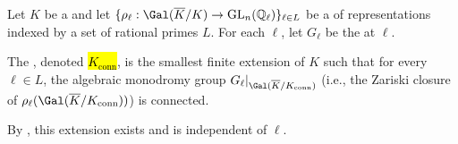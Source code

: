 \begin{definition} \label{definition:connectedness_extension_for_a_compatible_system_of_representations}
    Let $K$ be a  and let $\{ \rho_\ell : \Gal(\overline{K}/K) \to \mathrm{GL}_n(\mathbb{Q}_\ell) \}_{\ell \in L}$ be a  of representations indexed by a set of rational primes $L$. For each $\ell$, let $G_\ell$ be the  at $\ell$.

    The , denoted \hl{$K_{\mathrm{conn}}$}, is the smallest finite extension of $K$ such that for every $\ell \in L$, the algebraic monodromy group $G_\ell|_{\Gal(\overline{K}/K_{\mathrm{conn}})}$ (i.e., the Zariski closure of $\rho_\ell(\Gal(\overline{K}/K_{\mathrm{conn}}))$) is connected.

    By {\cite[Theorem~0.1]{larsen_pink_ccellgr}}, this extension exists and is independent of $\ell$.
\end{definition}
